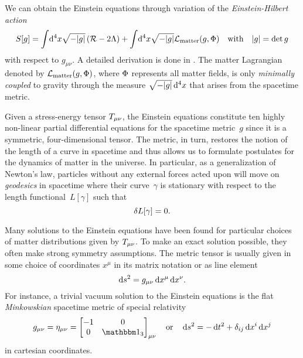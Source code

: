 \documentclass[12pt,parskip=half]{scrreprt}
\begin{document}
We can obtain the Einstein equations through variation of the \emph{Einstein-Hilbert action}
\begin{align}\label{eq:einstein_hilbert_action}
	S[g] = \int \! \dif{^4x} \sqrt{-\metrdet{g}} \del{\Rscal - 2\cosmconst} + \int \! \dif{^4x} \sqrt{-\metrdet{g}} \lagrdensmatter \quad \text{with} \quad \metrdet{g} = \det{g}
\end{align}
with respect to \(g_{\mu \nu}\). A detailed derivation is done in . The matter Lagrangian denoted by \(\mathcal{L}_\textnormal{matter}(g,\Phi)\), where \(\Phi\) represents all matter fields, is only \emph{minimally coupled} to gravity through the measure \(\sqrt{-\metrdet{g}}\dif{^4x}\) that arises from the spacetime metric.

Given a stress-energy tensor \(T_{\mu \nu}\), the Einstein equations constitute ten highly non-linear partial differential equations for the spacetime metric~\(g\) since it is a symmetric, four-dimensional tensor. The metric, in turn, restores the notion of the length of a curve in spacetime and thus allows us to formulate postulates for the dynamics of matter in the universe. In particular, as a generalization of Newton's law, particles without any external forces acted upon will move on \emph{geodesics} in spacetime where their curve~\(\gamma\) is stationary with respect to the length functional~\(L[\gamma]\) such that
\begin{equation}
	\delta L[\gamma] = 0
	\mathpunct{.}
\end{equation}

Many solutions to the Einstein equations have been found for particular choices of matter distributions given by \(T_{\mu\nu}\). To make an exact solution possible, they often make strong symmetry assumptions. The metric tensor is usually given in some choice of coordinates \(x^\mu\) in its matrix notation or as line element
\begin{equation}
	\dif{s}^2 = g_{\mu \nu}\dif{x}^\mu \dif{x}^\nu
	\eqpunct{.}
\end{equation}
For instance, a trivial vacuum solution to the Einstein equations is the flat \emph{Minkowskian} spacetime metric of special relativity
\begin{equation}
	g_{\mu \nu} = \eta_{\mu \nu} =
	\begin{bmatrix}
		-1 & 0 \\
		0 & \idmat_3
	\end{bmatrix}_{\mu \nu} \quad \text{or} \quad \dif{s}^2 = -\dif{t}^2 + \delta_{ij} \dif{x}^i \dif{x}^j
\end{equation}
in cartesian coordinates.  
\end{document}
